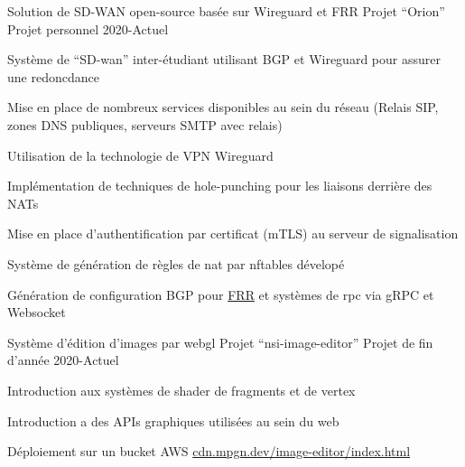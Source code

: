 
\begin{cventries}
  \cventry
    {Solution de SD-WAN open-source basée sur Wireguard et FRR}
    {Projet ``Orion'' \href{https://github.com/Orion-network-dev}{\faGithubSquare}}
    {Projet personnel}
    {2020-Actuel}
    {
      \vspace{-0.33cm}
      \begin{cvitems}
        \item {Système de ``SD-wan'' inter-étudiant utilisant BGP et Wireguard pour assurer une redoncdance}
        \item{Mise en place de nombreux services disponibles au sein du réseau (Relais SIP, zones DNS publiques, serveurs SMTP avec relais)}
        \item {Utilisation de la technologie de VPN Wireguard}
        \item {Implémentation de techniques de hole-punching pour les liaisons derrière des NATs}
        \item {Mise en place d'authentification par certificat (mTLS) au serveur de signalisation}
        \item {Système de génération de règles de nat par nftables dévelopé}
        \item {Génération de configuration BGP pour \href{https://github.com/FRRouting/frr.git}{FRR} et systèmes de rpc via gRPC et Websocket}
      \end{cvitems}
    }

  \cventry
    {Système d'édition d'images par webgl}
    {Projet ``nsi-image-editor'' \href{https://github.com/MatthieuCoder/nsi-image-editor}{\faGithubSquare}}
    {Projet de fin d'année}
    {2020-Actuel}
    {
      \vspace{-0.33cm}
      \begin{cvitems}
        \item {Introduction aux systèmes de shader de fragments et de vertex} 
        \item {Introduction a des APIs graphiques utilisées au sein du web}
        \item {Déploiement sur un bucket AWS \href{https://cdn.mpgn.dev/image-editor/index.html}{cdn.mpgn.dev/image-editor/index.html}}
      \end{cvitems}
    }


\end{cventries}
